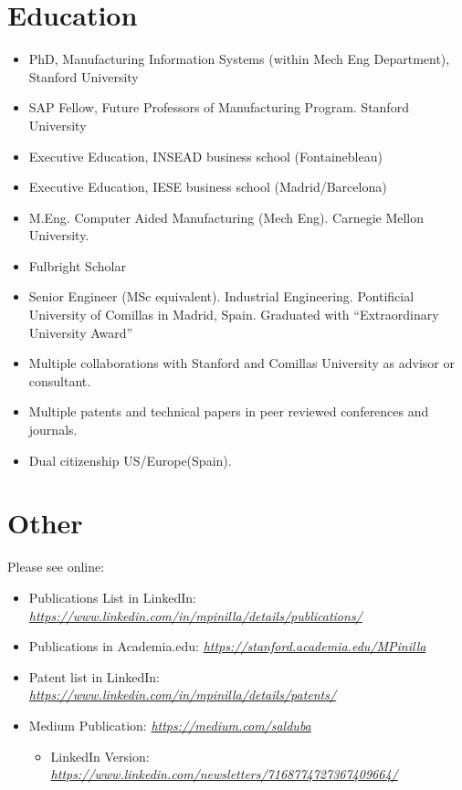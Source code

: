 \documentclass{res}
\begin{document}
\begin{resume}
\section{Education}

\vspace{0.2in}
\begin{itemize}
    \item PhD, Manufacturing Information Systems (within Mech Eng Department), Stanford University
    \item SAP Fellow, Future Professors of Manufacturing Program. Stanford University
    \item Executive Education, INSEAD business school (Fontainebleau)
    \item Executive Education, IESE business school (Madrid/Barcelona)
    \item M.Eng. Computer Aided Manufacturing (Mech Eng). Carnegie Mellon University.
    \item Fulbright Scholar
    \item Senior Engineer (MSc equivalent). Industrial Engineering. Pontificial University of Comillas in Madrid, Spain. Graduated with “Extraordinary University Award”
    \item Multiple collaborations with Stanford and Comillas University as advisor or consultant.
    \item Multiple patents and technical papers in peer reviewed conferences and journals.
    \item Dual citizenship US/Europe(Spain).
\end{itemize}

\section{Other}

Please see online:

\begin{itemize}
\item Publications List in LinkedIn: \href{https://www.linkedin.com/in/mpinilla/details/publications/}{\em https://www.linkedin.com/in/mpinilla/details/publications/}
\item Publications in Academia.edu: \href{https://stanford.academia.edu/MPinilla}{\em https://stanford.academia.edu/MPinilla}
\item Patent list in LinkedIn: \href{https://www.linkedin.com/in/mpinilla/details/patents/}{\em https://www.linkedin.com/in/mpinilla/details/patents/}
\item Medium Publication: \href{https://medium.com/salduba}{\em https://medium.com/salduba}
\begin{itemize}
\item LinkedIn Version: \href{https://www.linkedin.com/newsletters/7168774727367409664/}{\em https://www.linkedin.com/newsletters/7168774727367409664/}
\end{itemize}
\end{itemize}

\end{resume}
\end{document}

